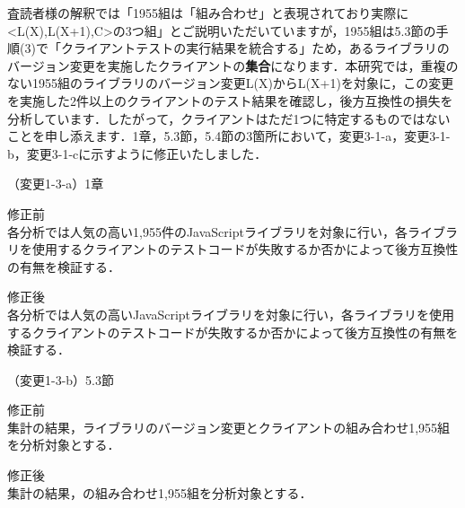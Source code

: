 \documentclass{jarticle} %
\def\subsection#1{ \vspace{1pc} {\gt #1} }
\begin{document}
査読者様の解釈では「1955組は「組み合わせ」と表現されており実際に<L(X),L(X+1),C>の3つ組」とご説明いただいていますが，1955組は5.3節の手順(3)で「クライアントテストの実行結果を統合する」ため，あるライブラリのバージョン変更を実施したクライアントの\textbf{集合}になります．本研究では，重複のない1955組のライブラリのバージョン変更L(X)からL(X+1)を対象に，この変更を実施した2件以上のクライアントのテスト結果を確認し，後方互換性の損失を分析しています．したがって，クライアントはただ1つに特定するものではないことを申し添えます．1章，5.3節，5.4節の3箇所において，変更3-1-a，変更3-1-b，変更3-1-cに示すように修正いたしました．



\subsection{（変更1-3-a）1章}
\vspace{-0.3cm}
\begin{description}
\item 修正前\\
\phantom{　}
各分析では人気の高い1,955件のJavaScriptライブラリを対象に行い，各ライブラリを使用するクライアントのテストコードが失敗するか否かによって後方互換性の有無を検証する．
\vspace{-0.3cm}
\item 修正後\\
\phantom{　}
各分析では人気の高いJavaScriptライブラリ\textcolor{red}{}を対象に行い，各ライブラリを使用するクライアントのテストコードが失敗するか否かによって後方互換性の有無を検証する．
\end{description}

\subsection{（変更1-3-b）5.3節}
\vspace{-0.3cm}
\begin{description}
\item 修正前\\
\phantom{　}
集計の結果，ライブラリのバージョン変更とクライアントの組み合わせ1,955組を分析対象とする．
\vspace{-0.3cm}
\item 修正後\\
\phantom{　}
集計の結果，\textcolor{red}{}の組み合わせ1,955組を分析対象とする．
\end{description}
\end{document}
